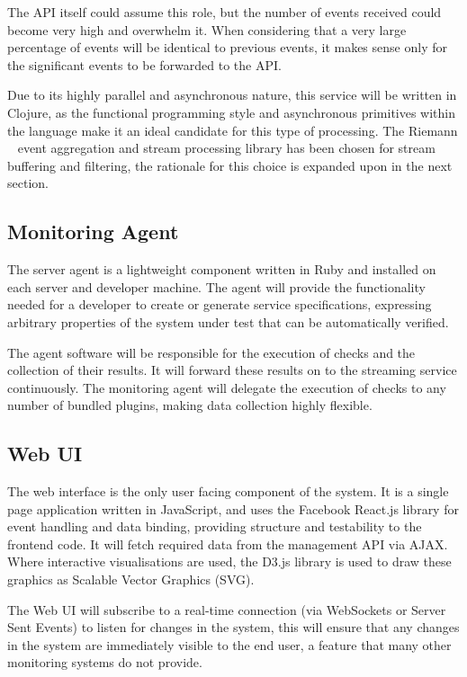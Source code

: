 \documentclass{cshonours}
\begin{document}
The API itself could assume this role, but the number of events received could become very high and overwhelm it. When considering that a very large percentage of events will be identical to previous events, it makes sense only for the significant events to be forwarded to the API.

Due to its highly parallel and asynchronous nature, this service will be written in Clojure, as the functional programming style and asynchronous primitives within the language make it an ideal candidate for this type of processing. The Riemann ~\cite{Riemann} event aggregation and stream processing library has been chosen for stream buffering and filtering, the rationale for this choice is expanded upon in the next section.

\subsection{Monitoring Agent}

The server agent is a lightweight component written in Ruby and installed on each server and developer machine. The agent will provide the functionality needed for a developer to create or generate service specifications, expressing arbitrary properties of the system under test that can be automatically verified.

The agent software will be responsible for the execution of checks and the collection of their results. It will forward these results on to the streaming service continuously. The monitoring agent will delegate the execution of checks to any number of bundled plugins, making data collection highly flexible.

\subsection{Web UI}

The web interface is the only user facing component of the system. It is a single page application written in JavaScript, and uses the Facebook React.js library for event handling and data binding, providing structure and testability to the frontend code. It will fetch required data from the management API via AJAX. Where interactive visualisations are used, the D3.js library is used to draw these graphics as Scalable Vector Graphics (SVG).

The Web UI will subscribe to a real-time connection (via WebSockets or Server Sent Events) to listen for changes in the system, this will ensure that any changes in the system are immediately visible to the end user, a feature that many other monitoring systems do not provide.
\end{document}
